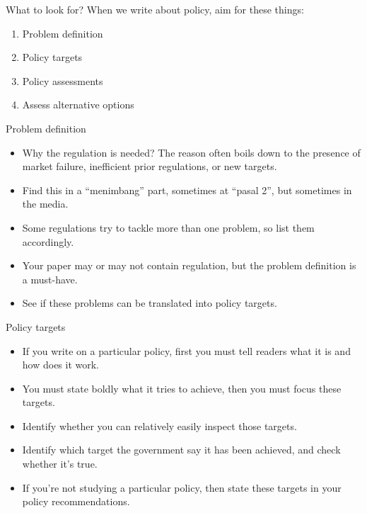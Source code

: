 \documentclass[
  ignorenonframetext,
]{beamer}
\begin{document}
\begin{frame}{What to look for?}
\protect\hypertarget{what-to-look-for}{}
When we write about policy, aim for these things:

\begin{enumerate}
\item
  Problem definition
\item
  Policy targets
\item
  Policy assessments
\item
  Assess alternative options
\end{enumerate}
\end{frame}

\begin{frame}{Problem definition}
\protect\hypertarget{problem-definition}{}
\begin{itemize}
\item
  Why the regulation is needed? The reason often boils down to the
  presence of market failure, inefficient prior regulations, or new
  targets.
\item
  Find this in a ``menimbang'' part, sometimes at ``pasal 2'', but
  sometimes in the media.
\item
  Some regulations try to tackle more than one problem, so list them
  accordingly.
\item
  Your paper may or may not contain regulation, but the problem
  definition is a must-have.
\item
  See if these problems can be translated into policy targets.
\end{itemize}
\end{frame}

\begin{frame}{Policy targets}
\protect\hypertarget{policy-targets}{}
\begin{itemize}
\item
  If you write on a particular policy, first you must tell readers what
  it is and how does it work.
\item
  You must state boldly what it tries to achieve, then you must focus
  these targets.
\item
  Identify whether you can relatively easily inspect those targets.
\item
  Identify which target the government say it has been achieved, and
  check whether it's true.
\item
  If you're not studying a particular policy, then state these targets
  in your policy recommendations.
\end{itemize}
\end{frame}
\end{document}
